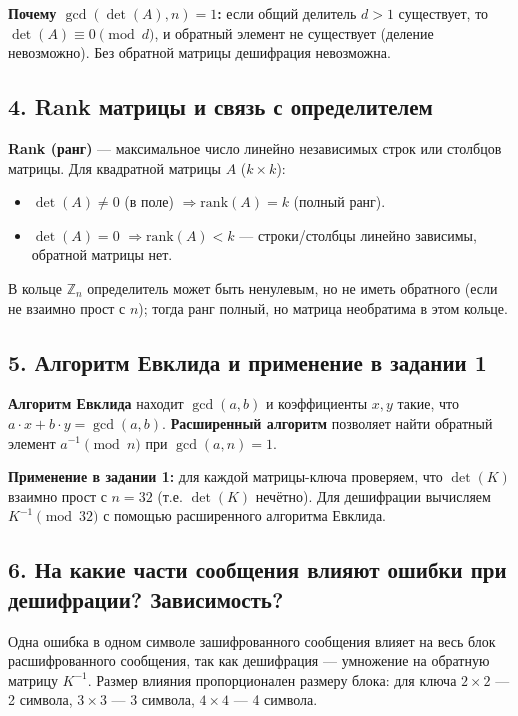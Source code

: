 \documentclass[a4paper, 12pt]{article}
\begin{document}
\textbf{Почему $\gcd(\det(A),n)=1$:} если общий делитель $d>1$ существует, то $\det(A) \equiv 0 \pmod{d}$, и обратный элемент не существует (деление невозможно). Без обратной матрицы дешифрация невозможна.

\subsection*{4. Rank матрицы и связь с определителем}

\textbf{Rank (ранг)} — максимальное число линейно независимых строк или столбцов матрицы. Для квадратной матрицы $A$ ($k \times k$):
\begin{itemize}
    \item $\det(A) \neq 0$ (в поле) $\Rightarrow \text{rank}(A) = k$ (полный ранг).
    \item $\det(A) = 0$ $\Rightarrow \text{rank}(A) < k$ — строки/столбцы линейно зависимы, обратной матрицы нет.
\end{itemize}
В кольце $\mathbb{Z}_n$ определитель может быть ненулевым, но не иметь обратного (если не взаимно прост с $n$); тогда ранг полный, но матрица необратима в этом кольце.

\subsection*{5. Алгоритм Евклида и применение в задании 1}

\textbf{Алгоритм Евклида} находит $\gcd(a,b)$ и коэффициенты $x,y$ такие, что $a \cdot x + b \cdot y = \gcd(a,b)$. \textbf{Расширенный алгоритм} позволяет найти обратный элемент $a^{-1} \pmod{n}$ при $\gcd(a,n)=1$.

\textbf{Применение в задании 1:} для каждой матрицы-ключа проверяем, что $\det(K)$ взаимно прост с $n=32$ (т.е. $\det(K)$ нечётно). Для дешифрации вычисляем $K^{-1} \pmod{32}$ с помощью расширенного алгоритма Евклида.

\subsection*{6. На какие части сообщения влияют ошибки при дешифрации? Зависимость?}

Одна ошибка в одном символе зашифрованного сообщения влияет на весь блок расшифрованного сообщения, так как дешифрация — умножение на обратную матрицу $K^{-1}$. Размер влияния пропорционален размеру блока: для ключа $2\times2$ — 2 символа, $3\times3$ — 3 символа, $4\times4$ — 4 символа.
\end{document}
